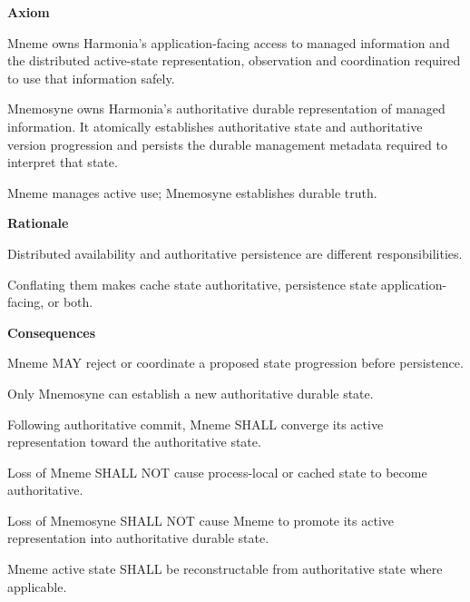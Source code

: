 \par\medskip\textbf{Axiom}\par


Mneme owns Harmonia's application-facing access to managed information
and the distributed active-state representation, observation and
coordination required to use that information safely.



Mnemosyne owns Harmonia's authoritative durable representation of
managed information. It atomically establishes authoritative state and
authoritative version progression and persists the durable management
metadata required to interpret that state.



Mneme manages active use; Mnemosyne establishes durable truth.



\par\medskip\textbf{Rationale}\par


Distributed availability and authoritative persistence are different
responsibilities.



Conflating them makes cache state authoritative, persistence state
application-facing, or both.



\par\medskip\textbf{Consequences}\par


Mneme MAY reject or coordinate a proposed state progression before
persistence.



Only Mnemosyne can establish a new authoritative durable state.



Following authoritative commit, Mneme SHALL converge its active
representation toward the authoritative state.



Loss of Mneme SHALL NOT cause process-local or cached state to become
authoritative.



Loss of Mnemosyne SHALL NOT cause Mneme to promote its active
representation into authoritative durable state.



Mneme active state SHALL be reconstructable from authoritative state
where applicable.



